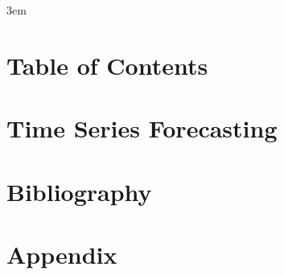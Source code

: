 \documentclass[10pt,twoside]{book}
\begin{document}
\emergencystretch 3em

\frontmatter











\chapter{Table of Contents}
\tableofcontents %
\clearpage

\chapter{Time Series Forecasting}
\clearpage


\chapter{Bibliography}
\clearpage
\begin{multicols}{2}
\printbibliography[heading=none]
\end{multicols}

\chapter{Appendix}
\clearpage

\end{document}
